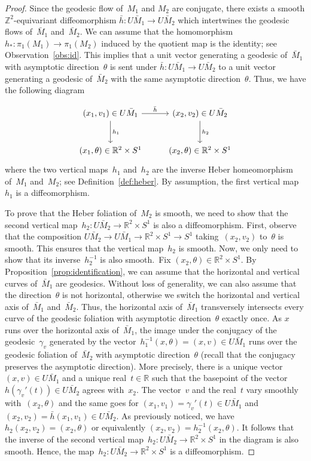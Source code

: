 \documentclass[AHL,Unicode,longabstracts,published]{cedram}
\newcommand{\Z}{\mathbb{Z}}
\newcommand{\R}{\mathbb{R}}
\begin{document}
\begin{proof}
Since the geodesic flow of~$M_1$ and $M_2$ are conjugate, there exists a smooth $\Z^2$-equivariant diffeomorphism $\bar{h}:U \bar{M}_1 \to U\bar{M}_2$ which intertwines the geodesic flows of~$\bar{M}_1$ and~$\bar{M}_2$. We can assume that the homomorphism $h_*:\pi_1(M_1) \to \pi_1(M_2)$ induced by the quotient map is the identity; see Observation~\ref{obs:id}. This implies that a unit vector generating a geodesic of~$\bar{M}_1$ with asymptotic direction~$\theta$ is sent under $\bar{h}:U\bar{M}_1 \to U\bar{M}_2$ to a unit vector generating a geodesic of~$\bar{M}_2$ with the same asymptotic direction~$\theta$. Thus, we have the following diagram

\[
\begin{tikzcd}[row sep=large]
(x_1,v_1) \in U\bar{M}_1 \arrow{d}{h_1} \arrow{r}{\bar{h}} & (x_2,v_2) \in U\bar{M}_2 \arrow{d}{h_2} \\
(x_1,\theta) \in \R^2 \times S^{1} & (x_2,\theta) \in \R^2 \times S^{1}
\end{tikzcd}
\]
where the two vertical maps~$h_1$ and~$h_2$ are the inverse Heber homeomorphism of~$M_1$ and~$M_2$; see Definition~\ref{def:heber}. By assumption, the first vertical map~$h_1$ is a diffeomorphism.

To prove that the Heber foliation of~$M_2$ is smooth, we need to show that the second vertical map~$h_2:U\bar{M}_2 \to \R^2 \times S^1$ is also a diffeomorphism. First, observe that the composition $U\bar{M}_2 \to U\bar{M}_1 \to \R^2 \times S^1 \to S^1$ taking~$(x_2,v_2)$ to~$\theta$ is smooth. This ensures that the vertical map~$h_2$ is smooth. Now, we only need to show that its inverse~$h_2^{-1}$ is also smooth.~Fix $(x_2,\theta) \in \R^2 \times S^1$. By Proposition~\ref{prop:identification}, we can assume that the horizontal and vertical curves of~$\bar{M}_1$ are geodesics. Without loss of generality, we can also assume that the direction~$\theta$ is not horizontal, otherwise we switch the horizontal and vertical axis of~$\bar{M}_1$ and~$\bar{M}_2$. Thus, the horizontal axis of~$\bar{M}_1$ transversely intersects every curve of the geodesic foliation with asymptotic direction~$\theta$ exactly once. As $x$ runs over the horizontal axis of~$\bar{M}_1$, the image under the conjugacy of the geodesic~$\gamma_v$ generated by the vector~$h_1^{-1}(x,\theta)= (x,v) \in U\bar{M}_1$ runs over the geodesic foliation of~$\bar{M}_2$ with asymptotic direction~$\theta$ (recall that the conjugacy preserves the asymptotic direction). More precisely, there is a unique vector $(x,v) \in U\bar{M}_1$ and a unique real~$t \in \R$ such that the basepoint of the vector~$h(\gamma_v'(t)) \in U\bar{M}_2$ agrees with~$x_2$. The vector~$v$ and the real~$t$ vary smoothly with~$(x_2,\theta)$ and the same goes for $(x_1,v_1)=\gamma_v'(t) \in U\bar{M}_1$ and $(x_2,v_2)=\bar{h}(x_1,v_1) \in U\bar{M}_2$. As previously noticed, we have $h_2(x_2,v_2) = (x_2,\theta)$ or equivalently $(x_2,v_2) = h_2^{-1}(x_2,\theta)$. It follows that the inverse of the second vertical map~$h_2:U\bar{M}_2 \to \R^2 \times S^1$ in the diagram is also smooth. Hence, the map~$h_2:U\bar{M}_2 \to \R^2 \times S^1$ is a diffeomorphism.
\end{proof}
\end{document}
